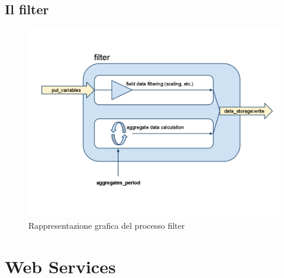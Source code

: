 %

%

\subsection{Il filter}
%
\begin{figure}[!h]
\centering
\includegraphics[width=380pt]{img/filter.png}
\caption{Rappresentazione grafica del processo filter}
\label{filter}
\end{figure}
%


\section{Web Services}

